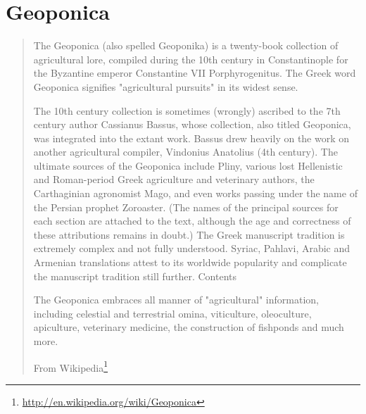 \documentclass[12pt,letterpaper,twoside,final]{memoir}
\begin{document}
\section{Geoponica}
\blockquote[From Wikipedia\footnote{\url{http://en.wikipedia.org/wiki/Geoponica}}]{The Geoponica (also spelled Geoponika) is a twenty-book collection of agricultural lore, compiled during the 10th century in Constantinople for the Byzantine emperor Constantine VII Porphyrogenitus. The Greek word Geoponica signifies "agricultural pursuits" in its widest sense.

The 10th century collection is sometimes (wrongly) ascribed to the 7th century author Cassianus Bassus, whose collection, also titled Geoponica, was integrated into the extant work. Bassus drew heavily on the work on another agricultural compiler, Vindonius Anatolius (4th century). The ultimate sources of the Geoponica include Pliny, various lost Hellenistic and Roman-period Greek agriculture and veterinary authors, the Carthaginian agronomist Mago, and even works passing under the name of the Persian prophet Zoroaster. (The names of the principal sources for each section are attached to the text, although the age and correctness of these attributions remains in doubt.) The Greek manuscript tradition is extremely complex and not fully understood. Syriac, Pahlavi, Arabic and Armenian translations attest to its worldwide popularity and complicate the manuscript tradition still further.
Contents

The Geoponica embraces all manner of "agricultural" information, including celestial and terrestrial omina, viticulture, oleoculture, apiculture, veterinary medicine, the construction of fishponds and much more.}
\end{document}
